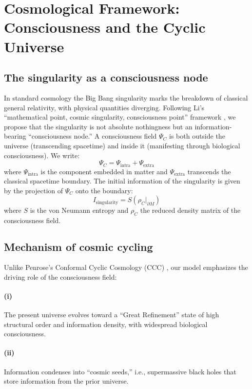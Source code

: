 \documentclass[11pt,a4paper]{article}
\begin{document}
\section{Cosmological Framework: Consciousness and the Cyclic Universe}

\subsection{The singularity as a consciousness node}

In standard cosmology the Big Bang singularity marks the breakdown of classical general relativity, with physical quantities diverging. Following Li's ``mathematical point, cosmic singularity, consciousness point'' framework \cite{Li2026a,Li2026b}, we propose that the singularity is not absolute nothingness but an information-bearing ``consciousness node.'' A consciousness field $\Psi_C$ is both outside the universe (transcending spacetime) and inside it (manifesting through biological consciousness). We write:
\begin{equation}
\Psi_C = \Psi_{\text{intra}} + \Psi_{\text{extra}}
\end{equation}
where $\Psi_{\text{intra}}$ is the component embedded in matter and $\Psi_{\text{extra}}$ transcends the classical spacetime boundary. The initial information of the singularity is given by the projection of $\Psi_C$ onto the boundary:
\begin{equation}
I_{\text{singularity}} = S\left(\rho_C|_{\partial M}\right)
\end{equation}
where $S$ is the von Neumann entropy and $\rho_C$ the reduced density matrix of the consciousness field.

\subsection{Mechanism of cosmic cycling}

Unlike Penrose's Conformal Cyclic Cosmology (CCC) \cite{Penrose2010,Gurzadyan2010}, our model emphasizes the driving role of the consciousness field:

\paragraph{(i)} The present universe evolves toward a ``Great Refinement'' state of high structural order and information density, with widespread biological consciousness.

\paragraph{(ii)} Information condenses into ``cosmic seeds,'' i.e., supermassive black holes that store information from the prior universe.
\end{document}
